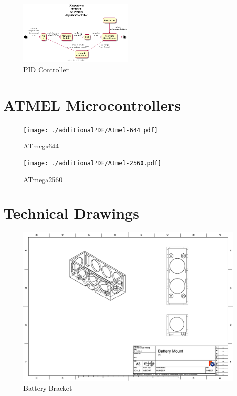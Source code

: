 \documentclass[pdftex,11pt]{article}
\begin{document}
\begin{figure}[!h]
	\centering
		\includegraphics[width=0.5\textwidth]{./plantUML/PIDloop}
	\caption{PID Controller}
	\label{fig:PIDloop}
\end{figure}

\clearpage
\section{ATMEL\textsuperscript{\textcopyright} Microcontrollers}
\label{sec:appATMEL}
\begin{figure}[!h]
	\centering
		\texttt{[image: ./additionalPDF/Atmel-644.pdf]}
	\caption{ATmega644}
	\label{fig:ATmega644}
\end{figure}

\begin{figure}[!h]
	\centering
		\texttt{[image: ./additionalPDF/Atmel-2560.pdf]}
	\caption{ATmega2560}
	\label{fig:ATmega2560}
\end{figure}

\clearpage

\section{Technical Drawings}
\label{sec:TechDraw}

\begin{figure}[!h]
	\centering
		\includegraphics[width=1\textwidth]{./graphics/BatteryBoxV5.eps}
	\caption{Battery Bracket}
	\label{fig:BattBin}
\end{figure}
\end{document}

